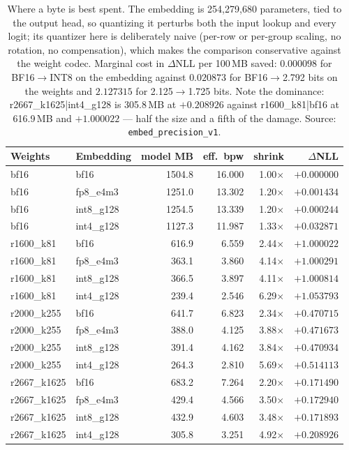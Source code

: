 \begin{table}[t]
\centering
\small
\begin{tabular}{llrrrr}
\toprule
Weights & Embedding & model MB & eff.\ bpw & shrink & $\Delta$NLL \\
\midrule
bf16 & bf16 & 1504.8 & 16.000 & 1.00$\times$ & $+0.000000$ \\
bf16 & fp8\_e4m3 & 1251.0 & 13.302 & 1.20$\times$ & $+0.001434$ \\
bf16 & int8\_g128 & 1254.5 & 13.339 & 1.20$\times$ & $+0.000244$ \\
bf16 & int4\_g128 & 1127.3 & 11.987 & 1.33$\times$ & $+0.032871$ \\
\midrule
r1600\_k81 & bf16 & 616.9 & 6.559 & 2.44$\times$ & $+1.000022$ \\
r1600\_k81 & fp8\_e4m3 & 363.1 & 3.860 & 4.14$\times$ & $+1.000291$ \\
r1600\_k81 & int8\_g128 & 366.5 & 3.897 & 4.11$\times$ & $+1.000814$ \\
r1600\_k81 & int4\_g128 & 239.4 & 2.546 & 6.29$\times$ & $+1.053793$ \\
\midrule
r2000\_k255 & bf16 & 641.7 & 6.823 & 2.34$\times$ & $+0.470715$ \\
r2000\_k255 & fp8\_e4m3 & 388.0 & 4.125 & 3.88$\times$ & $+0.471673$ \\
r2000\_k255 & int8\_g128 & 391.4 & 4.162 & 3.84$\times$ & $+0.470934$ \\
r2000\_k255 & int4\_g128 & 264.3 & 2.810 & 5.69$\times$ & $+0.514113$ \\
\midrule
r2667\_k1625 & bf16 & 683.2 & 7.264 & 2.20$\times$ & $+0.171490$ \\
r2667\_k1625 & fp8\_e4m3 & 429.4 & 4.566 & 3.50$\times$ & $+0.172940$ \\
r2667\_k1625 & int8\_g128 & 432.9 & 4.603 & 3.48$\times$ & $+0.171893$ \\
r2667\_k1625 & int4\_g128 & 305.8 & 3.251 & 4.92$\times$ & $+0.208926$ \\
\bottomrule
\end{tabular}
\caption{Where a byte is best spent. The embedding is 254,279,680 parameters, tied to the output head, so quantizing it perturbs both the input lookup and every logit; its quantizer here is deliberately naive (per-row or per-group scaling, no rotation, no compensation), which makes the comparison conservative against the weight codec. Marginal cost in $\Delta$NLL per 100\,MB saved: $0.000098$ for BF16$\to$INT8 on the embedding against $0.020873$ for BF16$\to$2.792 bits on the weights and $2.127315$ for 2.125$\to$1.725 bits. Note the dominance: r2667\_k1625|int4\_g128 is 305.8\,MB at $+0.208926$ against r1600\_k81|bf16 at 616.9\,MB and $+1.000022$ --- half the size and a fifth of the damage. Source: \texttt{embed\_precision\_v1}.}
\label{tab:embed}
\end{table}
